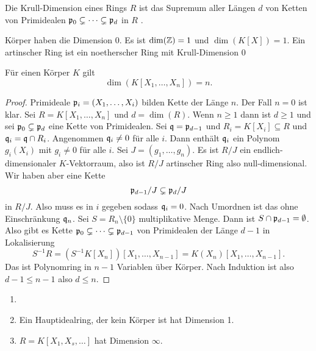 \begin{Def} Die Krull-Dimension eines Rings \(R\) ist das Supremum aller Längen \( d \) von 
	Ketten von Primidealen \( \mathfrak{p}_0\subsetneq \dots \subsetneq \mathfrak{p}_d \) in \( R \) .
	
\end{Def}
\begin{Bsp} Körper haben die Dimension \( 0 \). Es ist \( \dim ( \mathbb{Z} ) = 1 \) und \( \dim ( K [ X ] ) = 1 \). Ein 
	artinscher Ring ist ein noetherscher Ring mit Krull-Dimension \( 0 \)
	
\end{Bsp}
\begin{Lemma}
	Für einen Körper \( K \) gilt \[ \dim ( K [ X_1 , \dots , X_n ] ) = n . \]
\end{Lemma}
\begin{proof}
	Primideale \( \mathfrak{p}_i=(X_1,\dots, X_i )\) bilden Kette der Länge \( n \).
	Der Fall \( n = 0 \) ist klar. Sei \( R = K [ X_1 , \dots , X_n ] \) und \( d = \dim ( R ) \).
	Wenn \( n \geq 1 \) dann ist \( d \geq 1\) und sei \( \mathfrak{p}_0 \subsetneq \mathfrak{p}_d \) eine Kette von Primidealen. 
	Sei \( \mathfrak{q} = \mathfrak{p}_{ d - 1 } \) und \( R_i = K [ X_i ] \subseteq R \) und \( \mathfrak{q}_i = \mathfrak{q} \cap R_i \).
	Angenommen \( \mathfrak{q}_i \neq 0 \) für alle \( i \). Dann enthält \( \mathfrak{q}_i \) ein Polynom \( g_i ( X_i ) \) mit 
	\( g_i \neq 0 \) für alle \( i \).
	Sei \( J = ( g_1 , \dots , g_n ) \). Es ist \( R / J \) ein endlich-dimensionaler \( K \)-Vektorraum, also ist 
	\( R / J \) artinscher Ring also null-dimensional. Wir haben aber eine Kette \[ \mathfrak{p}_{d-1} / J \subsetneq \mathfrak{p}_d / J \]
	in \( R / J \). Also muss es in \( i \) gegeben sodass \( \mathfrak{q}_i = 0 \). Nach Umordnen ist das ohne Einschränkung 
	\( \mathfrak{q}_n \). Sei \( S = R_n \setminus \{ 0 \} \) multiplikative Menge. Dann ist \( S \cap \mathfrak{p}_{ d- 1 } = \emptyset \).
	Also gibt es Kette \( \mathfrak{p}_0 \subsetneq \dots \subsetneq \mathfrak{p}_{ d - 1 } \) von Primidealen der Länge \( d - 1 \)
	in Lokalisierung
	\[ S^{-1} R = ( S^{-1} K [ X_n ] ) [X_1 , \dots , X_{ n - 1 } ] = K ( X_n ) [ X_1 , \dots, X_{n-1} ]. \]
	Das ist Polynomring in \( n - 1 \) Variablen über Körper. Nach Induktion ist also \( d-1 \leq n -1 \) also \( d \leq n \).
	
\end{proof}
\begin{Lemma}
	\begin{enumerate}
		\item[]
		\item Ein Hauptidealring, der kein Körper ist hat Dimension 1.
		\item \( R = K[X_1,X_s,\dots] \) hat Dimension \( \infty \).
	\end{enumerate}
\end{Lemma}

